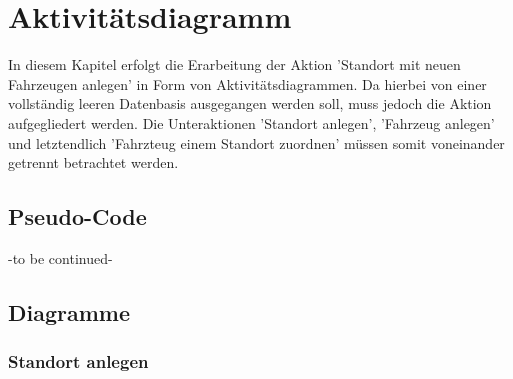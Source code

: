 \chapter{Aktivitätsdiagramm}

In diesem Kapitel erfolgt die Erarbeitung der Aktion 'Standort mit neuen Fahrzeugen anlegen' in Form von Aktivitätsdiagrammen. Da hierbei von einer vollständig leeren Datenbasis ausgegangen werden soll, muss jedoch die Aktion aufgegliedert werden. Die Unteraktionen 'Standort anlegen', 'Fahrzeug anlegen' und letztendlich 'Fahrzteug einem Standort zuordnen' müssen somit voneinander getrennt betrachtet werden. 

\section{Pseudo-Code}

-to be continued-

\section{Diagramme}

\newpage

\subsection{Standort anlegen}


